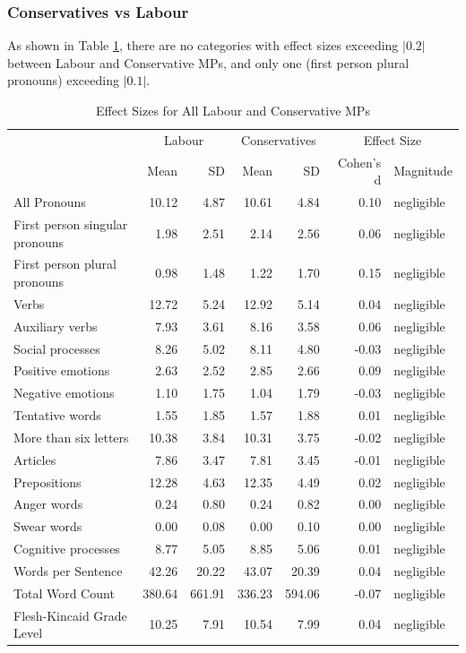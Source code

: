 \documentclass[]{article}
\theoremstyle{definition}
\theoremstyle{definition}
\theoremstyle{definition}
\theoremstyle{remark}
\begin{document}
\hypertarget{conservatives-vs-labour}{%
\subsubsection{Conservatives vs Labour}\label{conservatives-vs-labour}}

As shown in Table \ref{tab:tory-labour-effect-sizes-table}, there are no
categories with effect sizes exceeding \(|0.2|\) between Labour and
Conservative MPs, and only one (first person plural pronouns) exceeding
\(|0.1|\).

\begin{table}[H]

\caption{\label{tab:tory-labour-effect-sizes-table}Effect Sizes for All Labour and Conservative MPs}
\centering
\begin{tabular}[t]{lrrrrrl}
\toprule
\multicolumn{1}{c}{ } & \multicolumn{2}{c}{Labour} & \multicolumn{2}{c}{Conservatives} & \multicolumn{2}{c}{Effect Size} \\
\cmidrule(l{2pt}r{2pt}){2-3} \cmidrule(l{2pt}r{2pt}){4-5} \cmidrule(l{2pt}r{2pt}){6-7}
 & Mean & SD & Mean & SD & Cohen's d & Magnitude\\
\midrule
All Pronouns & 10.12 & 4.87 & 10.61 & 4.84 & 0.10 & negligible\\
First person singular pronouns & 1.98 & 2.51 & 2.14 & 2.56 & 0.06 & negligible\\
First person plural pronouns & 0.98 & 1.48 & 1.22 & 1.70 & 0.15 & negligible\\
Verbs & 12.72 & 5.24 & 12.92 & 5.14 & 0.04 & negligible\\
Auxiliary verbs & 7.93 & 3.61 & 8.16 & 3.58 & 0.06 & negligible\\
\addlinespace
Social processes & 8.26 & 5.02 & 8.11 & 4.80 & -0.03 & negligible\\
Positive emotions & 2.63 & 2.52 & 2.85 & 2.66 & 0.09 & negligible\\
Negative emotions & 1.10 & 1.75 & 1.04 & 1.79 & -0.03 & negligible\\
Tentative words & 1.55 & 1.85 & 1.57 & 1.88 & 0.01 & negligible\\
More than six letters & 10.38 & 3.84 & 10.31 & 3.75 & -0.02 & negligible\\
\addlinespace
Articles & 7.86 & 3.47 & 7.81 & 3.45 & -0.01 & negligible\\
Prepositions & 12.28 & 4.63 & 12.35 & 4.49 & 0.02 & negligible\\
Anger words & 0.24 & 0.80 & 0.24 & 0.82 & 0.00 & negligible\\
Swear words & 0.00 & 0.08 & 0.00 & 0.10 & 0.00 & negligible\\
Cognitive processes & 8.77 & 5.05 & 8.85 & 5.06 & 0.01 & negligible\\
\addlinespace
Words per Sentence & 42.26 & 20.22 & 43.07 & 20.39 & 0.04 & negligible\\
Total Word Count & 380.64 & 661.91 & 336.23 & 594.06 & -0.07 & negligible\\
Flesh-Kincaid Grade Level & 10.25 & 7.91 & 10.54 & 7.99 & 0.04 & negligible\\
\bottomrule
\end{tabular}
\end{table}
\end{document}
